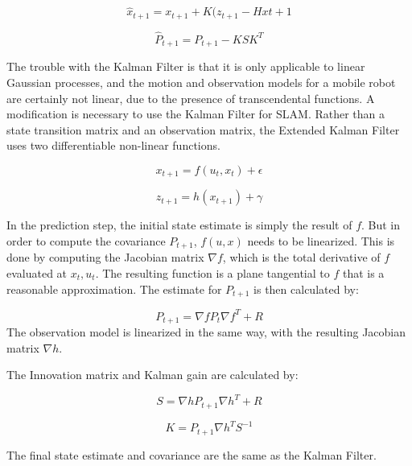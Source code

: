 \documentclass[12pt]{report}
\begin{document}
\begin{equation}\label{kf_update}
\hat{x}_{t+1} = x_{t+1} + K(z_{t+1} - Hx{t+1}
\end{equation}

\begin{equation}\label{kf_update_cov}
\hat{P}_{t+1} = P_{t+1} - KSK^T
\end{equation}


The trouble with the Kalman Filter is that it is only applicable to linear Gaussian processes, and the motion and observation models for a mobile robot are certainly not linear, due to the presence of transcendental functions.  A modification is necessary to use the Kalman Filter for SLAM.  Rather than a state transition matrix and an observation matrix, the Extended Kalman Filter uses two differentiable non-linear functions.

\begin{equation}\label{ekf_f}
x_{t+1} = f(u_t, x_t) + \epsilon
\end{equation}

\begin{equation}\label{ekf_h}
z_{t+1} = h(x_{t+1}) + \gamma
\end{equation}

In the prediction step, the initial state estimate is simply the result of $f$.  But in order to compute the covariance $P_{t+1}$, $f(u,x)$ needs to be linearized.  This is done by computing the Jacobian matrix $\nabla f$, which is the total derivative of $f$ evaluated at $x_t, u_t$.  The resulting function is a plane tangential to $f$ that is a reasonable approximation.  The estimate for $P_{t+1}$ is then calculated by:

\begin{equation}\label{ekf_cov}
P_{t+1} = \nabla fP_t \nabla f^T + R
\end{equation}
The observation model is linearized in the same way, with the resulting Jacobian matrix $\nabla h$.

The Innovation matrix and Kalman gain are calculated by:

\begin{equation}\label{ekf_S}
S = \nabla h P_{t+1} \nabla h^T + R
\end{equation}

\begin{equation}\label{ekf_K}
K = P_{t+1} \nabla h^TS^{-1}
\end{equation}

The final state estimate and covariance are the same as the Kalman Filter.
\end{document}
